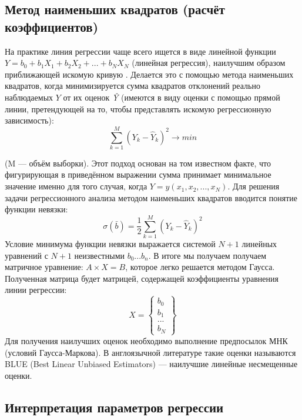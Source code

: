 \subsection{Метод наименьших квадратов (расчёт коэффициентов)}

На практике линия регрессии чаще всего ищется в виде линейной функции $Y = b_0 + b_1 X_1 + b_2 X_2 + ... + b_N X_N$ (линейная регрессия), наилучшим образом приближающей искомую кривую \cite{regrmeth}. Делается это с помощью метода наименьших квадратов, когда минимизируется сумма квадратов отклонений реально наблюдаемых $Y$ от их оценок \textit{\^Y} (имеются в виду оценки с помощью прямой линии, претендующей на то, чтобы представлять искомую регрессионную зависимость):
\begin{equation}
\sum\limits_{k=1}^{M}{(Y_k - \hat{Y}_k)^2} \rightarrow min
\end{equation}

(M — объём выборки). Этот подход основан на том известном факте, что фигурирующая в приведённом выражении сумма принимает минимальное значение именно для того случая, когда $Y = y(x_1,x_2,...,x_N)$.
Для решения задачи регрессионного анализа методом наименьших квадратов вводится понятие функции невязки:
\begin{equation}
\sigma(\bar{b}) = \frac{1}{2} \sum\limits_{k=1}^{M}{(Y_k - \hat{Y}_k)^2}
\end{equation}
Условие минимума функции невязки выражается системой $N+1$  линейных уравнений с $N+1$ неизвестными $b_0...b_n$.
В итоге мы получаем получаем матричное уравнение: $A \times X = B$, которое легко решается методом Гаусса. Полученная матрица будет матрицей, содержащей коэффициенты уравнения линии регрессии:
\begin{equation}
X = \left\{ \begin{array}{c}
b_0\\
b_1\\
...\\
b_N
\end{array} \right\}
\end{equation}
Для получения наилучших оценок необходимо выполнение предпосылок МНК (условий Гаусса-Маркова). В англоязычной литературе такие оценки называются BLUE (Best Linear Unbiased Estimators) --- наилучшие линейные несмещенные оценки.

\subsection{Интерпретация параметров регрессии}

